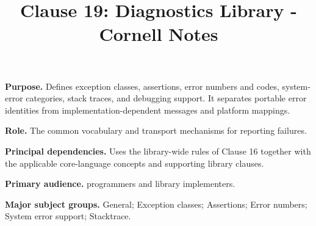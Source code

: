 \documentclass[11pt,letterpaper]{article}
\title{Clause 19: Diagnostics Library - Cornell Notes}
\author{}
\date{}
\begin{document}
\maketitle
\begin{CornellReferenceOrientationBox}
\textbf{Purpose.} Defines exception classes, assertions, error numbers and codes, system-error categories, stack traces, and debugging support. It separates portable error identities from implementation-dependent messages and platform mappings.
\par\textbf{Role.} The common vocabulary and transport mechanisms for reporting failures.
\par\textbf{Principal dependencies.} Uses the library-wide rules of Clause 16 together with the applicable core-language concepts and supporting library clauses.
\par\textbf{Primary audience.} programmers and library implementers.
\par\textbf{Major subject groups.} General; Exception classes; Assertions; Error numbers; System error support; Stacktrace.
\end{CornellReferenceOrientationBox}
\end{document}
